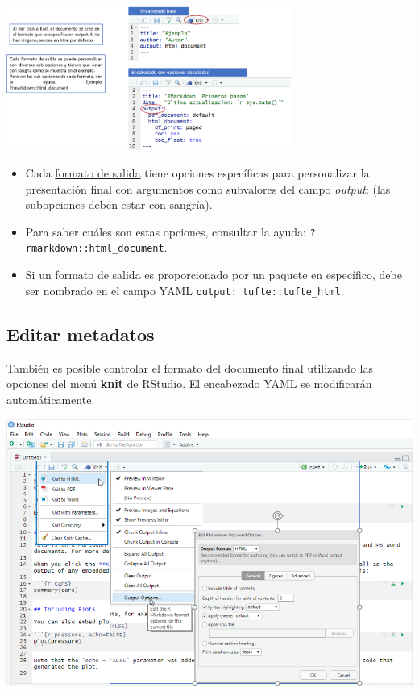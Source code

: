 \documentclass[
]{article}
\providecommand{\tightlist}{%
  \setlength{\itemsep}{0pt}\setlength{\parskip}{0pt}}
\begin{document}
\includegraphics[width=0.7\textwidth,height=\textheight]{images/yaml_ejemplo.png}

\begin{itemize}
\tightlist
\item
  Cada \href{https://rmarkdown.rstudio.com/formats.html}{formato de
  salida} tiene opciones específicas para personalizar la presentación
  final con argumentos como subvalores del campo \emph{output}: (las
  subopciones deben estar con sangría).
\item
  Para saber cuáles son estas opciones, consultar la ayuda:
  \texttt{?rmarkdown::html\_document}.
\item
  Si un formato de salida es proporcionado por un paquete en específico,
  debe ser nombrado en el campo YAML
  \texttt{output:\ tufte::tufte\_html}.
\end{itemize}

\hypertarget{editar-metadatos}{%
\subsection{Editar metadatos}\label{editar-metadatos}}

También es posible controlar el formato del documento final utilizando
las opciones del menú \textbf{knit} de RStudio. El encabezado YAML se
modificarán automáticamente.

\includegraphics{images/options.png}
\end{document}
